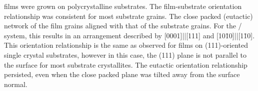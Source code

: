  films were grown on polycrystalline  substrates. The film-substrate orientation relationship was consistent for most substrate grains. The close packed (eutactic) network of the film grains aligned with that of the substrate grains. For the / system, this results in an arrangement described by [0001]||[111] and [10\={1}0]||[1\={1}0]. This orientation relationship is the same as observed for films on (111)-oriented single crystal substrates, however in this case, the (111) plane is not parallel to the surface for most substrate crystallites. The eutactic orientation relationship persisted, even when the close packed plane was tilted away from the surface normal.

